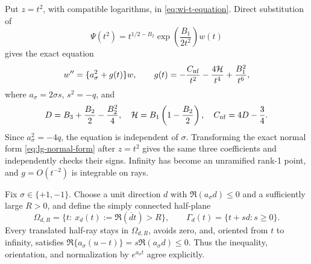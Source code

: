 \documentclass[11pt]{article}
\theoremstyle{remark}
\begin{document}
Put \(z=t^2\), with compatible logarithms, in
\eqref{eq:wi-t-equation}.  Direct substitution of
\begin{equation}
 \Psi(t^2)=t^{1/2-B_2}\exp\!\left(\frac{B_1}{2t^2}\right)w(t)
 \label{eq:olver-exact-substitution}
\end{equation}
gives the exact equation
\begin{equation}
 w''=\{a_\sigma^2+g(t)\}w,\qquad
 g(t)=-\frac{C_{\rm nf}}{t^2}-\frac{4\mathcal{H}}{t^4}+\frac{B_1^2}{t^6},
 \label{eq:olver-covering-normal-form}
\end{equation}
where \(a_\sigma=2\sigma s\), \(s^2=-q\), and
\begin{equation}
 D=B_3+\frac{B_2}{2}-\frac{B_2^2}{4},\quad
 \mathcal{H}=B_1\left(1-\frac{B_2}{2}\right),\quad C_{\rm nf}=4D-\frac34.
\end{equation}
Since \(a_\sigma^2=-4q\), the equation is independent of \(\sigma\).
Transforming the exact normal form \eqref{eq:lg-normal-form} after
\(z=t^2\) gives the same three coefficients and independently checks their
signs.  Infinity has become an unramified rank-1 point, and
\(g=O(t^{-2})\) is integrable on rays.

Fix \(\sigma\in\{+1,-1\}\).  Choose a unit direction \(d\) with
\(\Re(a_\sigma d)\leq0\) and a sufficiently large \(R>0\), and define the
simply connected half-plane
\begin{equation}
 \Omega_{d,R}=\{t:\ x_d(t):=\Re(\overline d t)>R\},\qquad
 \Gamma_d(t)=\{t+sd:s\geq0\}.
 \label{eq:olver-progressive-condition}
\end{equation}
Every translated half-ray stays in \(\Omega_{d,R}\), avoids zero, and,
oriented from \(t\) to infinity, satisfies
\(\Re\{a_\sigma(u-t)\}=s\Re(a_\sigma d)\leq0\).  Thus the inequality,
orientation, and normalization by \(e^{a_\sigma t}\) agree explicitly.
\end{document}
